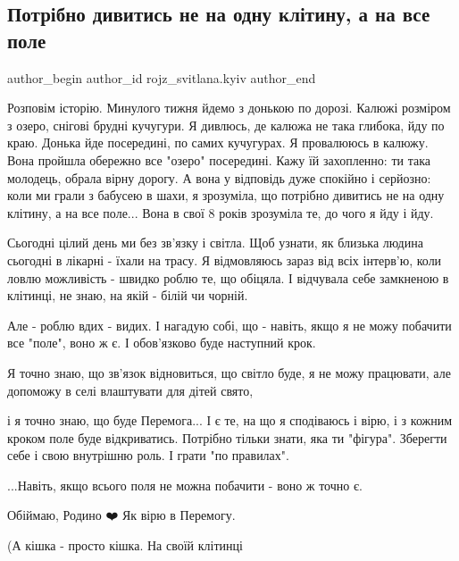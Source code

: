  
 
 
 
 
 
\subsection{Потрібно дивитись не на одну клітину, а на все поле}
\label{sec:20_12_2022.fb.rojz_svitlana.kyiv.1.pole}
 
\ifcmt
 author_begin
   author_id rojz_svitlana.kyiv
 author_end
\fi

Розповім історію. Минулого тижня йдемо з донькою по дорозі. Калюжі розміром з
озеро, снігові  брудні кучугури. Я дивлюсь, де калюжа не така глибока, йду по
краю. Донька йде посередині, по самих кучугурах. Я провалююсь в калюжу. Вона
пройшла обережно все "озеро" посередині. Кажу їй захопленно: ти така молодець,
обрала вірну дорогу. А вона у відповідь дуже спокійно і серйозно: коли ми грали
з бабусею в шахи, я зрозуміла, що потрібно дивитись не на одну клітину, а на
все поле... Вона в свої 8 років зрозуміла те, до чого я йду і йду. 

Сьогодні цілий день ми без зв'язку і світла. Щоб узнати, як близька людина
сьогодні в лікарні - їхали на трасу. Я відмовляюсь зараз від всіх інтерв'ю,
коли ловлю можливість - швидко роблю те, що обіцяла. І відчувала себе замкненою
в клітинці, не знаю, на якій - білій чи чорній. 

Але - роблю вдих - видих. І нагадую собі, що - навіть, якщо я не можу побачити
все "поле", воно ж є. І обов'язково буде наступний крок. 

Я точно знаю, що зв'язок відновиться, що світло буде, я не можу працювати, але
допоможу в селі влаштувати для дітей свято, 

і я точно знаю, що буде Перемога... І є те, на що я сподіваюсь і вірю, і з
кожним кроком поле буде відкриватись. Потрібно тільки знати, яка ти "фігура".
Зберегти себе і свою внутрішню роль. І грати "по правилах". 

...Навіть, якщо всього поля не можна побачити - воно ж точно є. 

Обіймаю, Родино ❤️ Як вірю в Перемогу. 

(А кішка - просто кішка. На своїй клітинці 🙂

